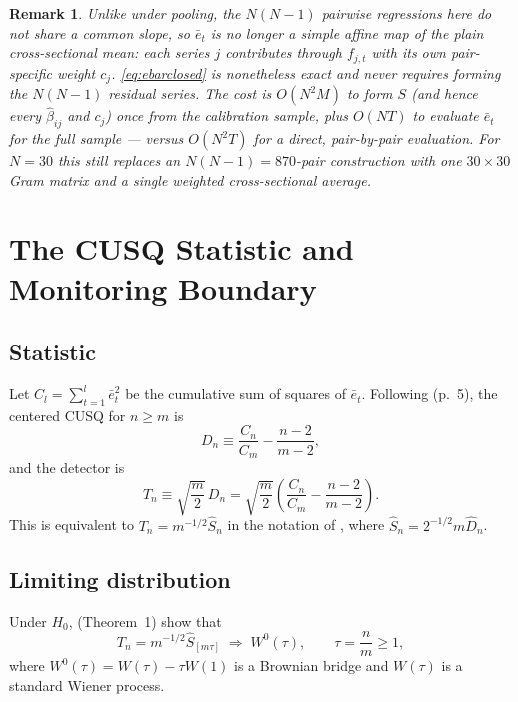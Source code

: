 \documentclass[12pt]{article}
\newtheorem{remark}{Remark}
\begin{document}
\begin{remark}
Unlike under pooling, the $N(N-1)$ pairwise regressions here do
\emph{not} share a common slope, so $\bar e_t$ is no longer a simple
affine map of the plain cross-sectional mean: each series $j$ contributes
through $f_{j,t}$ with its own pair-specific weight $c_j$.
\eqref{eq:ebarclosed} is nonetheless exact and never requires forming the
$N(N-1)$ residual series. The cost is $O(N^2M)$ to form $S$ (and hence
every $\hat\beta_{ij}$ and $c_j$) once from the calibration sample, plus
$O(NT)$ to evaluate $\bar e_t$ for the full sample --- versus $O(N^2T)$
for a direct, pair-by-pair evaluation. For $N=30$ this still replaces an
$N(N-1)=870$-pair construction with one $30\times30$ Gram matrix and a
single weighted cross-sectional average.
\end{remark}

\section{The CUSQ Statistic and Monitoring Boundary}
\label{sec:cusum}

\subsection{Statistic}

Let $C_l = \sum_{t=1}^{l}\bar e_t^2$ be the cumulative sum of squares of
$\bar e_t$. Following \citet{WangHsiao2013} (p.~5), the centered CUSQ for
$n \ge m$ is
\begin{equation}
D_n \equiv \frac{C_n}{C_m} - \frac{n-2}{m-2},
\label{eq:Dn}
\end{equation}
and the detector is
\begin{equation}
T_n \equiv \sqrt{\frac{m}{2}}\,D_n
     = \sqrt{\frac{m}{2}}\left(\frac{C_n}{C_m} - \frac{n-2}{m-2}\right).
\label{eq:Tn}
\end{equation}
This is equivalent to $T_n = m^{-1/2}\hat{S}_n$ in the notation of
\citet{WangHsiao2013}, where $\hat{S}_n = 2^{-1/2}m\hat{D}_n$.

\subsection{Limiting distribution}

Under $H_0$, \citet{WangHsiao2013} (Theorem~1) show that
\begin{equation}
T_n = m^{-1/2}\hat{S}_{[m\tau]} \;\Rightarrow\; W^0(\tau),
\qquad \tau = \frac{n}{m} \ge 1,
\label{eq:fclt}
\end{equation}
where $W^0(\tau) = W(\tau) - \tau W(1)$ is a Brownian bridge and $W(\tau)$
is a standard Wiener process.
\end{document}
